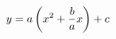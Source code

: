 \documentclass[preview]{standalone}
\begin{document}
\begin{align*}
\special{dvisvgm:raw <g id='unique000'>}y = a\left(x^2 + \frac{b}{a}x\right) + c\special{dvisvgm:raw </g>}
\end{align*}
\end{document}
